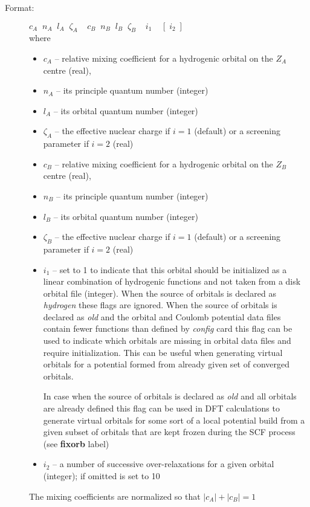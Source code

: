 \documentclass[12pt,a4paper]{article}
\newcommand{\fb}[1]{\textbf{#1}}
\begin{document}
\begin{description}
\begin{description}
\begin{description} 
\item[Format:] $c_A\;\;n_A \;\;l_A \;\;\zeta_A \;\;\;\;c_B\;\;n_B\;\;l_B\;\;
  \zeta_B\;\;\;\;i_1\;\;\;\;[\;i_2\;]$ \\
where
\begin{itemize}
\item[] $c_A$ -- relative mixing coefficient for a hydrogenic orbital on the
                    $Z_A$ centre (real),
\item[] $n_A$ -- its principle quantum number (integer) 
\item[] $l_A$ -- its orbital quantum number (integer) 
\item[] $\zeta_A$ -- the effective nuclear charge if $i=1$ (default) or
a screening parameter if $i=2$ (real)
\item[] $c_B$  -- relative mixing coefficient for a hydrogenic orbital on the
                    $Z_B$ centre (real),
\item[] $n_B$ -- its principle quantum number (integer)  
\item[] $l_B$ -- its orbital quantum number (integer) 
\item[] $\zeta_B$ -- the effective nuclear charge if $i=1$ (default) or
a screening parameter if $i=2$ (real)
\item[] $i_1$ -- set to 1 to indicate that this orbital should be initialized as a linear
  combination of hydrogenic functions and not taken from a disk orbital file (integer). When 
  the source of orbitals is declared as \textsl{hydrogen} these flags are ignored.
  When the source of orbitals is declared as \textsl{old} and
  the orbital and Coulomb potential data files contain fewer functions than defined by
  \textsl{config} card this flag can be used to indicate which orbitals are missing in
  orbital data files and require initialization. This can be useful when generating
  virtual orbitals for a potential formed from already given set of converged orbitals. 

  In case when the source of orbitals is declared as \textsl{old} and all orbitals are
  already defined this flag can be used in DFT calculations to generate virtual orbitals
  for some sort of a local potential build from a given subset of orbitals that are kept
  frozen during the SCF process (see \fb{fixorb} label)

\item[] $i_2$ -- a number of successive over-relaxations for a given orbital
(integer); if omitted is set to 10
\end{itemize}
The mixing coefficients are normalized so that $|c_A|+|c_B|=1$


\end{description}
\end{description}
\end{description}
\end{document}
